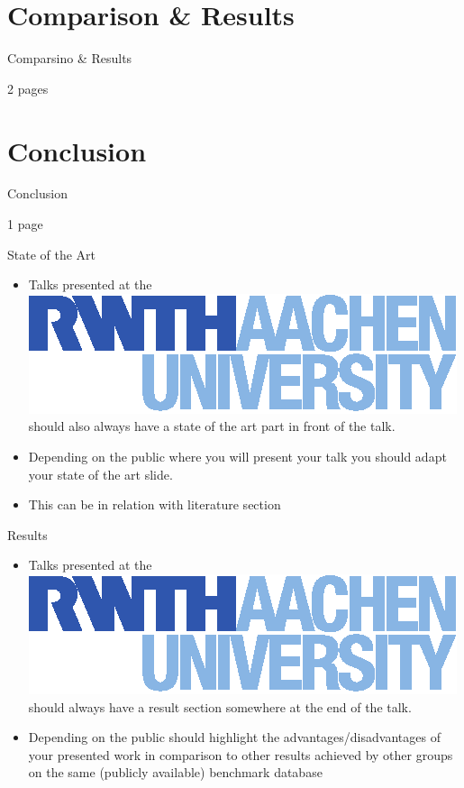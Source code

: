 \documentclass[xcolor=table,mathserif,9pt]{beamer}    %
\begin{document}
\section{Comparison \& Results}%
\label{sec:results}
\begin{frame}{Comparsino \& Results}

2 pages
\end{frame}

\section{Conclusion}%
\label{sec:conclusion}
\begin{frame}{Conclusion}

1 page
\end{frame}





\begin{frame}{State of the Art}
\begin{itemize}
\item Talks presented at the
  \href{http:://www-i6.rwth-aachen.de/}{\includegraphics[height=\baselineskip]{logos/logo_hltpr_rgb_RWTH.eps}}
  should also always have a state of the art part in front of the talk.
\item Depending on the public where you will present your talk you should
adapt your state of the art slide.
\item This can be in relation with literature section
\end{itemize}
\end{frame}

\begin{frame}{Results}
\begin{itemize}
\item Talks presented at the
  \href{http:://www-i6.rwth-aachen.de/}{\includegraphics[height=\baselineskip]{logos/logo_hltpr_rgb_RWTH.eps}}
  should always have a result section somewhere at the end of the talk.
\item Depending on the public should highlight the
  advantages/disadvantages of your presented work in comparison to
  other results achieved by other groups on the same (publicly
  available) benchmark database
\end{itemize}
\end{frame}
\end{document}
